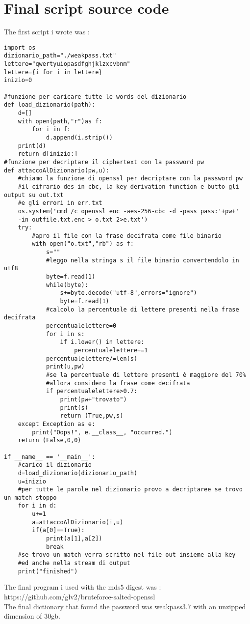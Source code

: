 \documentclass{article}
\begin{document}
\section{Final script source code}
The first script i wrote was :\\
\begin{verbatim}
import os
dizionario_path="./weakpass.txt"
lettere="qwertyuiopasdfghjklzxcvbnm"
lettere={i for i in lettere}
inizio=0

#funzione per caricare tutte le words del dizionario
def load_dizionario(path):
    d=[]
    with open(path,"r")as f:
        for i in f:
            d.append(i.strip())
    print(d)
    return d[inizio:]
#funzione per decriptare il ciphertext con la password pw
def attaccoAlDizionario(pw,u):
    #chiamo la funzione di openssl per decriptare con la password pw
    #il cifrario des in cbc, la key derivation function e butto gli output su out.txt
    #e gli errori in err.txt
    os.system('cmd /c openssl enc -aes-256-cbc -d -pass pass:'+pw+' 
    -in outfile.txt.enc > o.txt 2>e.txt')
    try:
        #apro il file con la frase decifrata come file binario
        with open("o.txt","rb") as f:
            s=""
            #leggo nella stringa s il file binario convertendolo in utf8
            byte=f.read(1)
            while(byte):
                s+=byte.decode("utf-8",errors="ignore")
                byte=f.read(1)
            #calcolo la percentuale di lettere presenti nella frase decifrata
            percentualelettere=0
            for i in s:
                if i.lower() in lettere:
                    percentualelettere+=1
            percentualelettere/=len(s)
            print(u,pw)
            #se la percentuale di lettere presenti è maggiore del 70%
            #allora considero la frase come decifrata
            if percentualelettere>0.7:
                print(pw+"trovato")
                print(s)
                return (True,pw,s)
    except Exception as e:
        print("Oops!", e.__class__, "occurred.")   
    return (False,0,0)
    
if __name__ == '__main__':
    #carico il dizionario
    d=load_dizionario(dizionario_path)
    u=inizio
    #per tutte le parole nel dizionario provo a decriptaree se trovo un match stoppo
    for i in d:
        u+=1
        a=attaccoAlDizionario(i,u)
        if(a[0]==True):
            print(a[1],a[2])
            break
    #se trovo un match verra scritto nel file out insieme alla key
    #ed anche nella stream di output
    print("finished")
\end{verbatim}

The final program i used with the mds5 digest was : 
\\https://github.com/glv2/bruteforce-salted-openssl\\
The final dictionary that found the password was weakpass3.7 with an unzipped dimension of 30gb.
\end{document}
